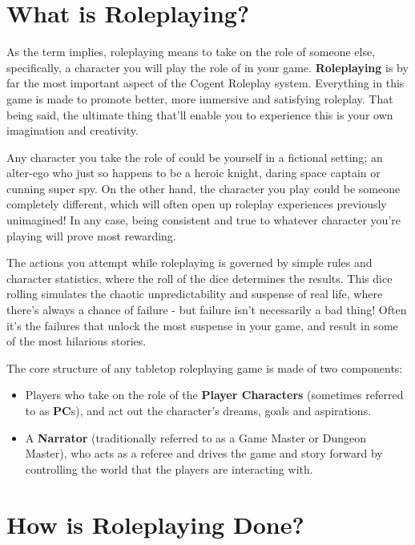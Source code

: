 \section{What is Roleplaying?} \label{sec:what_is_roleplaying}

As the term implies, roleplaying means to take on the role of someone else, specifically, a character you will play the role of in your game. \textbf{Roleplaying} is by far the most important aspect of the Cogent Roleplay system. Everything in this game is made to promote better, more immersive and satisfying roleplay. That being said, the ultimate thing that'll enable you to experience this is your own imagination and creativity.

Any character you take the role of could be yourself in a fictional setting; an alter-ego who just so happens to be a heroic knight, daring space captain or cunning super spy. On the other hand, the character you play could be someone completely different, which will often open up roleplay experiences previously unimagined! In any case, being consistent and true to whatever character you're playing will prove most rewarding.

The actions you attempt while roleplaying is governed by simple rules and character statistics, where the roll of the dice determines the results. This dice rolling simulates the chaotic unpredictability and suspense of real life, where there's always a chance of failure - but failure isn't necessarily a bad thing! Often it's the failures that unlock the most suspense in your game, and result in some of the most hilarious stories.

The core structure of any tabletop roleplaying game is made of two components:

\begin{itemize}
\item Players who take on the role of the \textbf{Player Characters} (sometimes referred to as \textbf{PC}s), and act out the character's dreams, goals and aspirations.

\item A \textbf{Narrator} (traditionally referred to as a Game Master or Dungeon Master), who acts as a referee and drives the game and story forward by controlling the world that the players are interacting with.
\end{itemize}

\section{How is Roleplaying Done?} \label{sec:how_is_role_playing_done}


